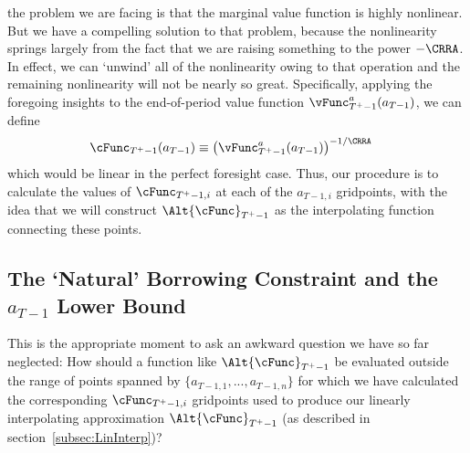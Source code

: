 \documentclass[titlepage, headings=optiontotocandhead]{\econtex}
\begin{document}
the problem we are facing is that the marginal value function is
highly nonlinear.  But we have a compelling solution to that problem,
because the nonlinearity springs largely from the fact that we are raising
something to the power $-\CRRA$.  In effect, we can `unwind' all of
the nonlinearity owing to that operation and the remaining
nonlinearity will not be nearly so great.  Specifically, applying the foregoing insights
to the end-of-period value function $\vFunc^{{a}}_{T^{+}-1}({a}_{T-1})$, we can define
\begin{equation}\begin{gathered}\begin{aligned}
      \cFunc_{T^{+}-1}({a}_{T-1})  & \equiv  \left(\vFunc^{{a}}_{T^{+}-1}({a}_{T-1})\right)^{-1/\CRRA} \label{eq:cGoth}
    \end{aligned}\end{gathered}\end{equation}
which would be linear in the perfect foresight case.  Thus, our
procedure is to calculate the values of $\cFunc_{T^{+}-1,i}$ at each
of the ${a}_{T-1,i}$ gridpoints, with the idea that we will construct
$\Alt{\cFunc}_{T^{+}-1}$ as the interpolating function connecting
these
points.  %


\hypertarget{The-Natural-Borrowing-Constraint-and-the-a-Lower-Bound}{}
\subsection{The `Natural' Borrowing Constraint and the $a_{T-1}$ Lower Bound} \label{subsec:LiqConstrSelfImposed}


This is the appropriate moment to ask an awkward question we have so far
neglected: How should a function like $\Alt{\cFunc}_{T^{+}-1}$
be evaluated outside the range of points spanned by
$\{{a}_{T-1,1},...,{a}_{T-1,n}\}$ for which we have calculated
the corresponding $\cFunc_{T^{+}-1,i}$ gridpoints used to produce our
linearly interpolating approximation $\Alt{\cFunc}_{T^{+}-1}$ (as described in section~\ref{subsec:LinInterp})?
\end{document}
